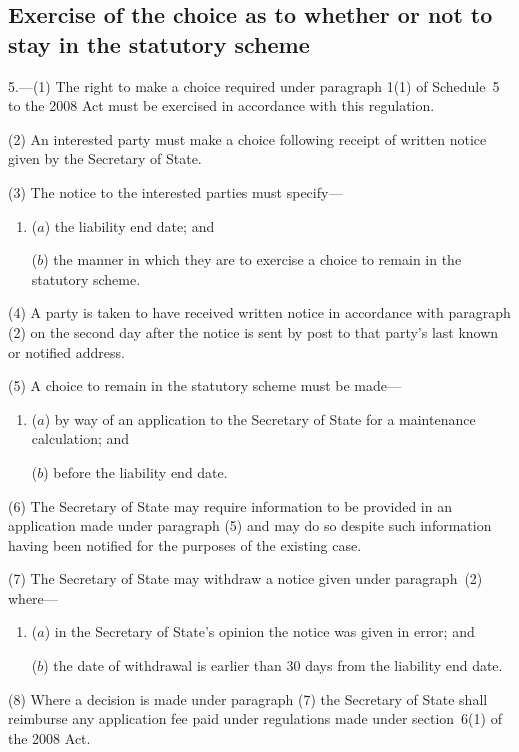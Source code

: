 \documentclass[12pt,a4paper]{article}
\begin{document}
\subsection[5. Exercise of the choice as to whether or not to stay in the statutory scheme]{Exercise of the choice as to whether or not to stay in the statutory scheme}

5.—(1) The right to make a choice required under paragraph 1(1) of Schedule~5 to the 2008 Act must be exercised in accordance with this regulation.

(2) An interested party must make a choice following receipt of written notice given by the Secretary of State.

(3) The notice to the interested parties must specify—
\begin{enumerate}\item[]
($a$) the liability end date; and

($b$) the manner in which they are to exercise a choice to remain in the statutory scheme.
\end{enumerate}

(4) A party is taken to have received written notice in accordance with paragraph (2) on the second day after the notice is sent by post to that party’s last known or notified address.

(5) A choice to remain in the statutory scheme must be made—
\begin{enumerate}\item[]
($a$) by way of an application to the Secretary of State for a maintenance calculation; and

($b$) before the liability end date.
\end{enumerate}

(6) The Secretary of State may require information to be provided in an application made under paragraph (5) and may do so despite such information having been notified for the purposes of the existing case.

(7) The Secretary of State may withdraw a notice given under paragraph~(2) where—
\begin{enumerate}\item[]
($a$) in the Secretary of State’s opinion the notice was given in error; and

($b$) the date of withdrawal is earlier than 30 days from the liability end date.
\end{enumerate}

(8) Where a decision is made under paragraph (7) the Secretary of State shall reimburse any application fee paid under regulations made under section~6(1) of the 2008 Act.
\end{document}
